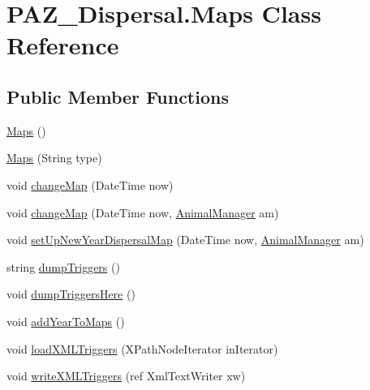 \hypertarget{class_p_a_z___dispersal_1_1_maps}{\section{P\-A\-Z\-\_\-\-Dispersal.\-Maps Class Reference}
\label{class_p_a_z___dispersal_1_1_maps}
}
\subsection*{Public Member Functions}
\begin{DoxyCompactItemize}
\item 
\hyperlink{class_p_a_z___dispersal_1_1_maps_ad227257c8ab2232f83ff8c596b1af7a5}{Maps} ()
\item 
\hyperlink{class_p_a_z___dispersal_1_1_maps_a6ee2cfec08459ae9c582dd36fe196fa4}{Maps} (String type)
\item 
void \hyperlink{class_p_a_z___dispersal_1_1_maps_a7729cf1fb3ba822cf820ff40796a4c5c}{change\-Map} (Date\-Time now)
\item 
void \hyperlink{class_p_a_z___dispersal_1_1_maps_a96c8decb1303fcc7fd8a0fc263bb6667}{change\-Map} (Date\-Time now, \hyperlink{class_p_a_z___dispersal_1_1_animal_manager}{Animal\-Manager} am)
\item 
void \hyperlink{class_p_a_z___dispersal_1_1_maps_a0617984b986dd2cec6e32dddfbbc2b3a}{set\-Up\-New\-Year\-Dispersal\-Map} (Date\-Time now, \hyperlink{class_p_a_z___dispersal_1_1_animal_manager}{Animal\-Manager} am)
\item 
string \hyperlink{class_p_a_z___dispersal_1_1_maps_a67c348039910e7fa1a2eb0759ee196e8}{dump\-Triggers} ()
\item 
void \hyperlink{class_p_a_z___dispersal_1_1_maps_ac6f6fe2c76fd253782b67eedc9322297}{dump\-Triggers\-Here} ()
\item 
void \hyperlink{class_p_a_z___dispersal_1_1_maps_a7757e628150a0b0861fa8eba58e5d59d}{add\-Year\-To\-Maps} ()
\item 
void \hyperlink{class_p_a_z___dispersal_1_1_maps_add1eefeffcb0064466ea6d11f367f0ed}{load\-X\-M\-L\-Triggers} (X\-Path\-Node\-Iterator in\-Iterator)
\item 
void \hyperlink{class_p_a_z___dispersal_1_1_maps_a29961b0c8a84e3b910701c9f1bde9ab5}{write\-X\-M\-L\-Triggers} (ref Xml\-Text\-Writer xw)
\end{DoxyCompactItemize}

